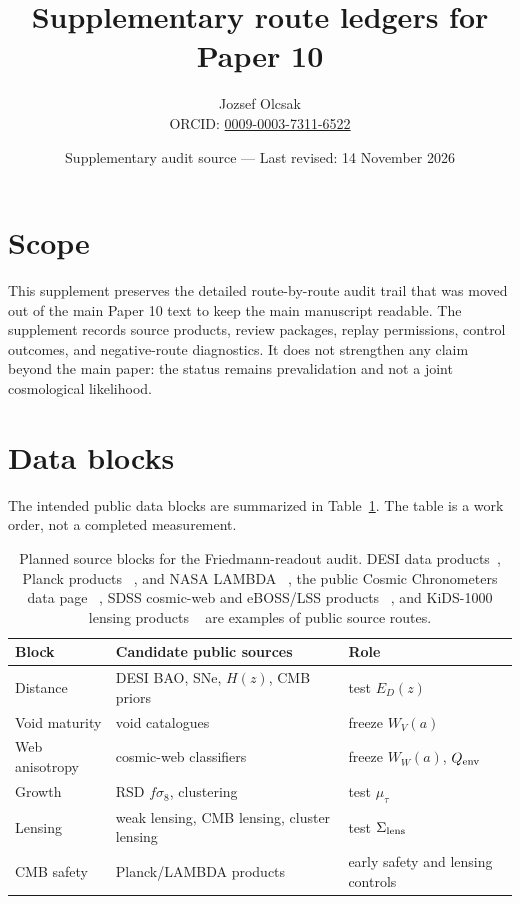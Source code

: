 \documentclass[11pt]{article}
\title{Supplementary route ledgers for Paper 10}
\author{Jozsef Olcsak\\{\small ORCID: \href{https://orcid.org/0009-0003-7311-6522}{0009-0003-7311-6522}}}
\date{Supplementary audit source --- Last revised: 14 November 2026}
\begin{document}
\maketitle

\section*{Scope}

This supplement preserves the detailed route-by-route audit trail that was
moved out of the main Paper 10 text to keep the main manuscript readable.  The
supplement records source products, review packages, replay permissions,
control outcomes, and negative-route diagnostics.  It does not strengthen any
claim beyond the main paper: the status remains prevalidation and not a joint
cosmological likelihood.

\section{Data blocks}

The intended public data blocks are summarized in
Table~\ref{tab:data-blocks}. The table is a work order, not a completed
measurement.

\begin{table}[h]
\centering
\small
\begin{tabular}{lll}
\toprule
Block & Candidate public sources & Role \\
\midrule
Distance & DESI BAO, SNe, \(H(z)\), CMB priors & test \(E_D(z)\) \\
Void maturity & void catalogues & freeze \(W_V(a)\) \\
Web anisotropy & cosmic-web classifiers & freeze \(W_W(a)\), \(Q_{\rm env}\) \\
Growth & RSD \(f\sigma_8\), clustering & test \(\mu_\tau\) \\
Lensing & weak lensing, CMB lensing, cluster lensing & test \(\Sigma_{\rm lens}\) \\
CMB safety & Planck/LAMBDA products & early safety and lensing controls \\
\bottomrule
\end{tabular}
\caption{Planned source blocks for the Friedmann-readout audit. DESI data
products~\cite{DESIDR2BAO2025,DESIDR2Products2025}, Planck products
~\cite{Planck2018Cosmology,PlanckLegacyArchive}, and NASA LAMBDA
~\cite{NASALAMBDA}, the public Cosmic Chronometers data page
~\cite{CosmicChronometersData}, SDSS cosmic-web and eBOSS/LSS products
~\cite{SDSSCosmicWebVAC,SDSSDR16LSS}, and KiDS-1000 lensing products
~\cite{KiDS1000Lensing} are examples of public source routes.}
\label{tab:data-blocks}
\end{table}
\end{document}
